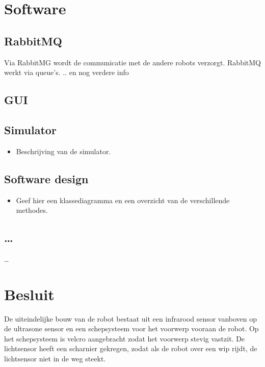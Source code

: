 \documentclass[tt1]{penoverslag}
\begin{document}
\section{Software}
\label{secc:softw}

\subsection{RabbitMQ}
\label{secc:RabbMQ}
Via RabbitMG wordt de communicatie met de andere robots verzorgt. RabbitMQ werkt via queue's. .. en nog verdere info

\subsection{GUI}


\subsection{Simulator}
\begin{itemize}
\item Beschrijving van de simulator.
\end{itemize}

\subsection{Software design}
\begin{itemize}
\item Geef hier een klassediagramma en een overzicht van de verschillende methodes.
\end{itemize}

\subsection{\ldots}
\ldots


\section{Besluit}
De uiteindelijke bouw van de robot bestaat uit een infrarood sensor vanboven op de ultrasone sensor en een schepsysteem voor het voorwerp vooraan de robot. Op het schepsysteem is velcro aangebracht zodat het voorwerp stevig vastzit. De lichtsensor heeft een scharnier gekregen, zodat als de robot over een wip rijdt, de lichtsensor niet in de weg steekt. 
\end{document}
